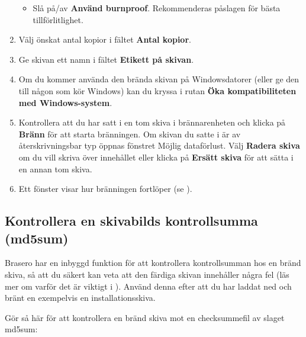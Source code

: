 \documentclass[a4paper,final]{memoir} %
\begin{document}
\begin{enumerate}
\begin{itemize}
\item Slå på/av \textbf{Använd burnproof}. Rekommenderas påslagen för bästa tillförlitlighet.

\end{itemize}

\item Välj önskat antal kopior i fältet \textbf{Antal kopior}.

\item Ge skivan ett namn i fältet \textbf{Etikett på skivan}.

\item Om du kommer använda den brända skivan på Windowsdatorer (eller ge den till någon som kör Windows) kan du kryssa i rutan \textbf{Öka kompatibiliteten med Windows-system}.

\item Kontrollera att du har satt i en tom skiva i brännarenheten och klicka på \textbf{Bränn} för att starta bränningen. Om skivan du satte i är av återskrivningsbar typ öppnas fönstret Möjlig dataförlust. Välj \textbf{Radera skiva} om du vill skriva över innehållet eller klicka på \textbf{Ersätt skiva} för att sätta i en annan tom skiva. 

\item Ett fönster visar hur bränningen fortlöper (se ).


\end{enumerate}

\subsection{Kontrollera en skivabilds kontrollsumma (md5sum)}\label{sec:brasero-md5sum}

Brasero har en inbyggd funktion för att kontrollera kontrollsumman hos en bränd skiva, så att du säkert kan veta att den färdiga skivan innehåller några fel (läs mer om varför det är viktigt i ). Använd denna efter att du har laddat ned och bränt en exempelvis en installationsskiva.


Gör så här för att kontrollera en bränd skiva mot en checksummefil av slaget md5sum:
\end{document}
